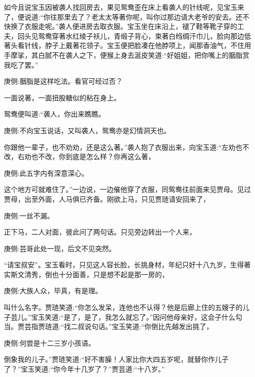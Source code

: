 \begin{parag}
    如今且说宝玉因被袭人找回房去，果见鸳鸯歪在床上看袭人的针线呢，见宝玉来了，便说道:“你往那里去了？老太太等著你呢，叫你过那边请大老爷的安去。还不快换了衣服走呢。”袭人便进房去取衣服。宝玉坐在床沿上，褪了鞋等靴子穿的工夫，回头见鸳鸯穿著水红绫子袄儿，青缎子背心，束著白绉绸汗巾儿，脸向那边低著头看针线，脖子上戴著花领子。宝玉便把脸凑在他脖项上，闻那香油气，不住用手摩挲，其白腻不在袭人之下，便猴上身去涎皮笑道:“好姐姐，把你嘴上的胭脂赏我吃了罢。”\begin{note}庚侧:胭脂是这样吃法。看官可经过否？\end{note}一面说著，一面扭股糖似的粘在身上。
\end{parag}


\begin{parag}
    鸳鸯便叫道:“袭人，你出来瞧瞧。\begin{note}庚侧:不向宝玉说话，又叫袭人，鸳鸯亦是幻情洞天也。\end{note}你跟他一辈子，也不劝劝，还是这么著。”袭人抱了衣服出来，向宝玉道:“左劝也不改，右劝也不改，你到底是怎么样？你再这么著，\begin{note}庚侧:此五字内有深意深心。\end{note}这个地方可就难住了。”一边说，一边催他穿了衣服，同鸳鸯往前面来见贾母。见过贾母，出至外面，人马俱已齐备。刚欲上马，只见贾琏请安回来了，\begin{note}庚侧:一丝不漏。\end{note}正下马，二人对面，彼此问了两句话。只见旁边转出一个人来，\begin{note}庚侧:芸哥此处一现，后文不见突然。\end{note}“请宝叔安”。宝玉看时，只见这人容长脸，长挑身材，年纪只好十八九岁，生得著实斯文清秀，倒也十分面善，只是想不起是那一房的，\begin{note}庚侧:大族人众，毕真，有是理。\end{note}叫什么名字。贾琏笑道:“你怎么发呆，连他也不认得？他是后廊上住的五嫂子的儿子芸儿。”宝玉笑道:“是了，是了，我怎么就忘了。”因问他母亲好，这会子什么勾当。贾芸指贾琏道:“找二叔说句话。”宝玉笑道:“你倒比先越发出挑了，\begin{note}庚侧:何尝是十二三岁小孩语。\end{note}倒象我的儿子。”贾琏笑道:“好不害臊！人家比你大四五岁呢，就替你作儿子了？”宝玉笑道:“你今年十几岁了？”贾芸道:“十八岁。”
\end{parag}


